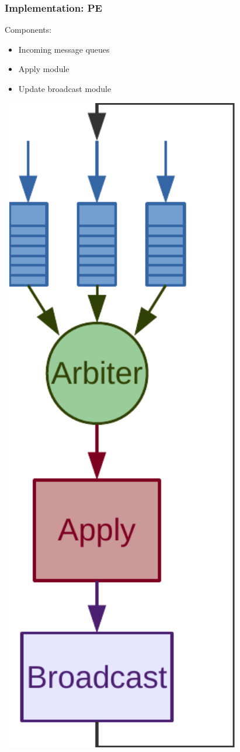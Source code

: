\documentclass[14pt]{beamer}
\begin{document}
\begin{frame}
	\frametitle{Implementation: PE}
	\begin{minipage}{0.68\textwidth}
	Components:

	\begin{itemize}
		\addtolength{\itemsep}{0.5\baselineskip}
		\item Incoming message queues
		\item Apply module
		\item Update broadcast module
	\end{itemize}
	\end{minipage}
	\begin{minipage}{0.3\textwidth}
		\includegraphics[width=0.8\textwidth]{arch.pdf}

\end{minipage}
\end{frame}
\end{document}

